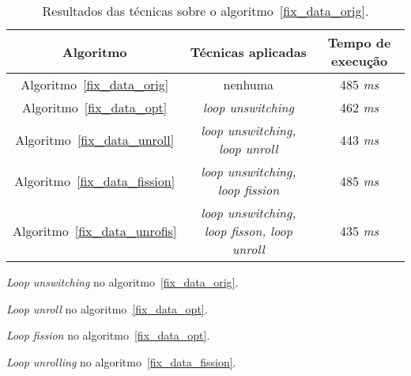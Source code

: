 \begin{table}[ht]
  \label{tabela_fix_data}
\begin{center}
  \begin{tabular}{|c|c|c|}
    \hline
    \textbf{Algoritmo} & \textbf{Técnicas aplicadas} & \textbf{Tempo de execução}\\
    \hline
    Algoritmo~\ref{fix_data_orig} & nenhuma & 485 \textit{ms} \\
    \hline
    Algoritmo~\ref{fix_data_opt} & \textit{loop unswitching} & 462 \textit{ms} \\
    \hline
    Algoritmo~\ref{fix_data_unroll} & \textit{loop unswitching, loop unroll} & 443 \textit{ms} \\
    \hline
    Algoritmo~\ref{fix_data_fission} & \textit{loop unswitching, loop fission} & 485 \textit{ms} \\
    \hline
    Algoritmo~\ref{fix_data_unrofis} & \textit{loop unswitching, loop fisson,
                        loop unroll} & 435 \textit{ms} \\
    \hline
  \end{tabular}
  \caption{Resultados das técnicas sobre o algoritmo~\ref{fix_data_orig}.}
\end{center}
\end{table}



\begin{algorithm}[H]
  \caption{\textit{Loop unswitching} no algoritmo~\ref{fix_data_orig}.}
    \label{fix_data_opt}

\end{algorithm}

\begin{algorithm}[H]
  \caption{\textit{Loop unroll} no algoritmo~\ref{fix_data_opt}.}
    \label{fix_data_unroll}

\end{algorithm}

\begin{algorithm}[H]
  \caption{\textit{Loop fission} no algoritmo~\ref{fix_data_opt}.}
    \label{fix_data_fission}

\end{algorithm}

\begin{algorithm}[H]
  \caption{\textit{Loop unrolling} no algoritmo~\ref{fix_data_fission}.}
    \label{fix_data_unrofis}

\end{algorithm}

